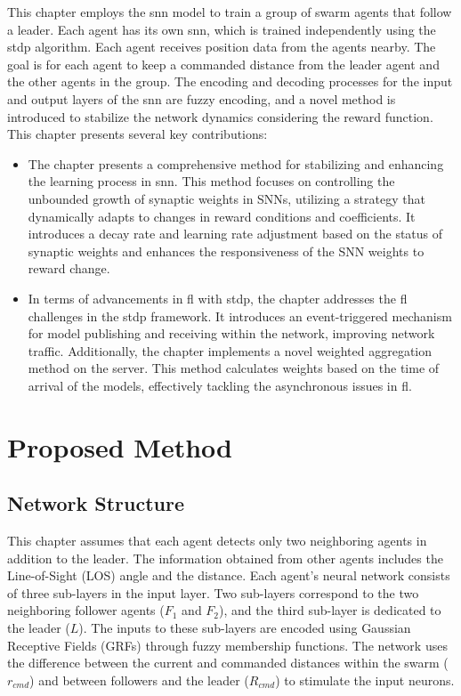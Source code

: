 This chapter employs the \ac{snn} model to train a group of swarm agents that follow a leader. Each agent has its own \ac{snn}, which is trained independently using the \ac{stdp} algorithm. Each agent receives position data from the agents nearby. The goal is for each agent to keep a commanded distance from the leader agent and the other agents in the group. The encoding and decoding processes for the input and output layers of the \ac{snn} are fuzzy encoding, and a novel method is introduced to stabilize the network dynamics considering the reward function. This chapter presents several key contributions:

\begin{itemize}
    \item The chapter presents a comprehensive method for stabilizing and enhancing the learning process in \ac{snn}. This method focuses on controlling the unbounded growth of synaptic weights in SNNs, utilizing a strategy that dynamically adapts to changes in reward conditions and coefficients. It introduces a decay rate and learning rate adjustment based on the status of synaptic weights and enhances the responsiveness of the SNN weights to reward change.
    
    \item In terms of advancements in \ac{fl} with \ac{stdp}, the chapter addresses the \ac{fl} challenges in the \ac{stdp} framework. It introduces an event-triggered mechanism for model publishing and receiving within the network, improving network traffic. Additionally, the chapter implements a novel weighted aggregation method on the server. This method calculates weights based on the time of arrival of the models, effectively tackling the asynchronous issues in \ac{fl}.
  \end{itemize}

\section{Proposed Method}

\subsection{Network Structure}


This chapter assumes that each agent detects only two neighboring agents in addition to the leader. The information obtained from other agents includes the Line-of-Sight (LOS) angle and the distance. Each agent’s neural network consists of three sub-layers in the input layer. Two sub-layers correspond to the two neighboring follower agents ($F_{1}$ and $F_{2}$), and the third sub-layer is dedicated to the leader ($L$). The inputs to these sub-layers are encoded using Gaussian Receptive Fields (GRFs) through fuzzy membership functions. The network uses the difference between the current and commanded distances within the swarm ($r_{cmd}$) and between followers and the leader ($R_{cmd}$) to stimulate the input neurons.

